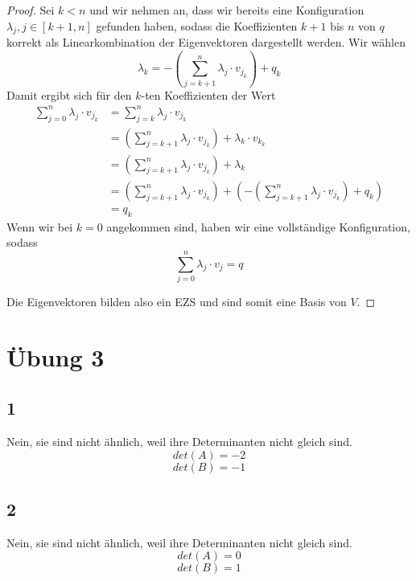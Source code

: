 \documentclass[10pt,a4paper]{article}
\begin{document}
\begin{proof}
Sei $k < n$ und wir nehmen an, dass wir bereits eine Konfiguration $\lambda_{j}, j \in [k + 1, n]$ gefunden haben, sodass die Koeffizienten $k + 1$ bis $n$ von $q$ korrekt als Linearkombination der Eigenvektoren dargestellt werden.
Wir wählen
\begin{equation}
\lambda_{k} = -\left( \sum_{j = k + 1}^{n} \lambda_{j} \cdot v_{j_{k}} \right) + q_{k}
\end{equation}
Damit ergibt sich für den $k$-ten Koeffizienten der Wert
\begin{align}
\sum_{j = 0}^{n} \lambda_{j} \cdot v_{j_{k}} & = \sum_{j = k}^{n} \lambda_{j} \cdot v_{j_{k}}\\
& = \left( \sum_{j = k + 1}^{n} \lambda_{j} \cdot v_{j_{k}} \right) + \lambda_{k} \cdot v_{k_{k}}\\
& = \left( \sum_{j = k + 1}^{n} \lambda_{j} \cdot v_{j_{k}} \right) + \lambda_{k}\\
& = \left( \sum_{j = k + 1}^{n} \lambda_{j} \cdot v_{j_{k}} \right) + \left( -\left( \sum_{j = k + 1}^{n} \lambda_{j} \cdot v_{j_{k}} \right) + q_{k} \right)\\
& = q_{k}
\end{align}
Wenn wir bei $k = 0$ angekommen sind, haben wir eine vollständige Konfiguration, sodass
\begin{equation}
\sum_{j = 0}^{n} \lambda_{j} \cdot v_{j} = q
\end{equation}

Die Eigenvektoren bilden also ein EZS und sind somit eine Basis von $V$.
\end{proof}

\section*{Übung 3}

\subsection*{1}

Nein, sie sind nicht ähnlich, weil ihre Determinanten nicht gleich sind.
\begin{equation}
det(A) = -2
\end{equation}
\begin{equation}
det(B) = -1
\end{equation}

\subsection*{2}

Nein, sie sind nicht ähnlich, weil ihre Determinanten nicht gleich sind.
\begin{equation}
det(A) = 0
\end{equation}
\begin{equation}
det(B) = 1
\end{equation}
\end{document}
